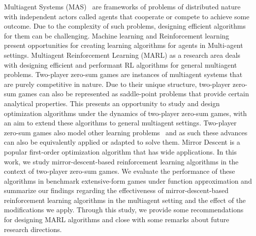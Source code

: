 \documentclass{uicthesi}
\newcounter{problem}
\begin{document}
Multiagent Systems (MAS)~\cite{tuylsMultiagent2012} are frameworks of problems of distributed
nature with independent actors called agents that cooperate or compete to achieve some outcome.
Due to the complexity of such problems, designing efficient algorithms for them can be challenging.
Machine learning and Reinforcement learning present opportunities for creating learning algorithms
for agents in Multi-agent settings.
Multiagent Reinforcement Learning (MARL) as a research area deals with designing efficient and
performant RL algorithms for general multiagent problems.
Two-player zero-sum games are instances of multiagent systems that are purely competitive in
nature.
Due to their unique structure, two-player zero-sum games can also be represented as saddle-point
problems that provide certain analytical properties.
This presents an opportunity to study and design optimization algorithms under the dynamics of
two-player zero-sum games, with an aim to extend these algorithms to general multiagent settings.
Two-player zero-sum games also model other learning problems~\cite{goodfellowGenerative2014} and as
such these advances can also be equivalently applied or adapted to solve them.
Mirror Descent is a popular first-order optimization algorithm that has wide applications.
In this work, we study mirror-descent-based reinforcement learning algorithms in the context of
two-player zero-sum games.
We evaluate the performance of these algorithms in benchmark extensive-form games under
function approximation and summarize our findings regarding the effectiveness of mirror-descent-based reinforcement
learning algorithms in the multiagent setting and the effect of the modifications we apply.
Through this study, we provide some recommendations for designing MARL algorithms and close with some
remarks about future research directions.












% 
% 

\appendices
\newpage
\appendix


\bibformb

\newpage
\end{document}
